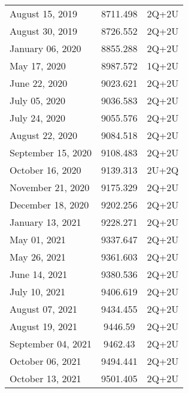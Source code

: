 \documentclass{/Users/art2/TeX/aanda/aa}
\begin{document}
\begin{appendix}
\begin{table} [t]
\begin{tabular}{lcl}
August 15, 2019 & 8711.498 & 2Q+2U \\

August 30, 2019 & 8726.552 & 2Q+2U \\

January 06, 2020 & 8855.288 & 2Q+2U \\

May 17, 2020 & 8987.572 & 1Q+2U \\

June 22, 2020 & 9023.621 & 2Q+2U \\

July 05, 2020 & 9036.583 & 2Q+2U \\

July 24, 2020 & 9055.576 & 2Q+2U \\

August 22, 2020 & 9084.518 & 2Q+2U \\

September 15, 2020 & 9108.483 & 2Q+2U \\

October 16, 2020 & 9139.313 & 2U+2Q \\

November 21, 2020 & 9175.329 & 2Q+2U \\

December 18, 2020 & 9202.256 & 2Q+2U \\

January 13, 2021 & 9228.271 & 2Q+2U \\

May 01, 2021 & 9337.647 & 2Q+2U \\

May 26, 2021 & 9361.603 & 2Q+2U \\

June 14, 2021 & 9380.536 & 2Q+2U \\

July 10, 2021 & 9406.619 & 2Q+2U \\

August 07, 2021 & 9434.455 & 2Q+2U \\

August 19, 2021 & 9446.59 & 2Q+2U \\

September 04, 2021 & 9462.43 & 2Q+2U \\

October 06, 2021 & 9494.441 & 2Q+2U \\

October 13, 2021 & 9501.405 & 2Q+2U \\


\end{tabular}
\end{table}
\end{appendix}
\end{document}
